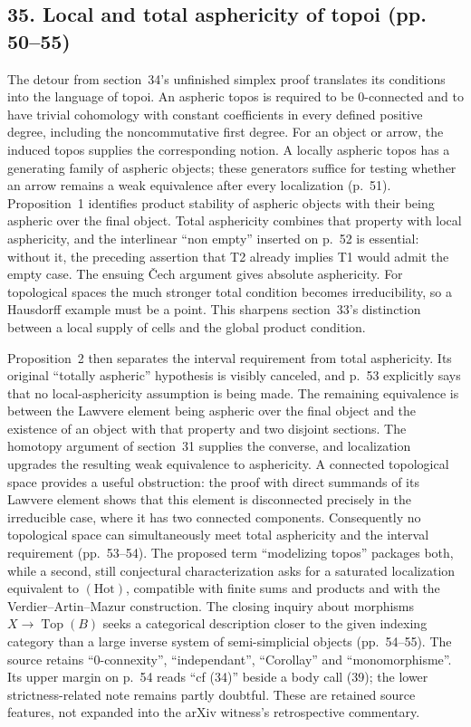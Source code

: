 \subsection*{35. Local and total asphericity of topoi (pp. 50--55)}
The detour from section~34's unfinished simplex proof translates its conditions into the language of topoi. An aspheric topos is required to be $0$-connected and to have trivial cohomology with constant coefficients in every defined positive degree, including the noncommutative first degree. For an object or arrow, the induced topos supplies the corresponding notion. A locally aspheric topos has a generating family of aspheric objects; these generators suffice for testing whether an arrow remains a weak equivalence after every localization (p.~51). Proposition~1 identifies product stability of aspheric objects with their being aspheric over the final object. Total asphericity combines that property with local asphericity, and the interlinear ``non empty'' inserted on p.~52 is essential: without it, the preceding assertion that T2 already implies T1 would admit the empty case. The ensuing \v{C}ech argument gives absolute asphericity. For topological spaces the much stronger total condition becomes irreducibility, so a Hausdorff example must be a point. This sharpens section~33's distinction between a local supply of cells and the global product condition.

Proposition~2 then separates the interval requirement from total asphericity. Its original ``totally aspheric'' hypothesis is visibly canceled, and p.~53 explicitly says that no local-asphericity assumption is being made. The remaining equivalence is between the Lawvere element being aspheric over the final object and the existence of an object with that property and two disjoint sections. The homotopy argument of section~31 supplies the converse, and localization upgrades the resulting weak equivalence to asphericity. A connected topological space provides a useful obstruction: the proof with direct summands of its Lawvere element shows that this element is disconnected precisely in the irreducible case, where it has two connected components. Consequently no topological space can simultaneously meet total asphericity and the interval requirement (pp.~53--54). The proposed term ``modelizing topos'' packages both, while a second, still conjectural characterization asks for a saturated localization equivalent to $(\mathrm{Hot})$, compatible with finite sums and products and with the Verdier--Artin--Mazur construction. The closing inquiry about morphisms $X\to\operatorname{Top}(B)$ seeks a categorical description closer to the given indexing category than a large inverse system of semi-simplicial objects (pp.~54--55). The source retains ``0-connexity'', ``independant'', ``Corollay'' and ``monomorphisme''. Its upper margin on p.~54 reads ``cf (34)'' beside a body call (39); the lower strictness-related note remains partly doubtful. These are retained source features, not expanded into the arXiv witness's retrospective commentary.


